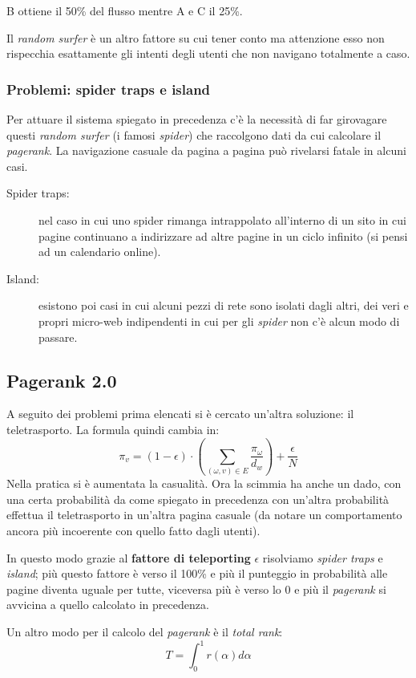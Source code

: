 					B ottiene il 50\% del flusso mentre A e C il 25\%.
					
				Il \emph{random surfer} è un altro fattore su cui tener conto ma attenzione esso non rispecchia esattamente gli intenti degli utenti che non navigano totalmente a caso.
			
			\subsubsection{Problemi: spider traps e island}
				Per attuare il sistema spiegato in precedenza c'è la necessità di far girovagare questi \emph{random surfer} (i famosi \emph{spider}) che raccolgono dati da cui calcolare il \emph{pagerank}. La navigazione casuale da pagina a pagina può rivelarsi fatale in alcuni casi.
				\begin{description}
					\item[Spider traps:] nel caso in cui uno spider rimanga intrappolato all'interno di un sito in cui pagine continuano a indirizzare ad altre pagine in un ciclo infinito (si pensi ad un calendario online).
					\item[Island:] esistono poi casi in cui alcuni pezzi di rete sono isolati dagli altri, dei veri e propri micro-web indipendenti in cui per gli \emph{spider} non c'è alcun modo di passare. 
				\end{description}
				
		\subsection{Pagerank 2.0}
			A seguito dei problemi prima elencati si è cercato un'altra soluzione: il teletrasporto. La formula quindi cambia in:
			\[
				\pi_v=(1-\epsilon)\cdot(\sum_{(\omega, v) \in E}\frac{\pi_{\omega}}{d_w})+\frac{\epsilon}{N}
			\]
			Nella pratica si è aumentata la casualità. Ora la scimmia ha anche un dado, con una certa probabilità da come spiegato in precedenza con un'altra probabilità effettua il teletrasporto in un'altra pagina casuale (da notare un comportamento ancora più incoerente con quello fatto dagli utenti).
			
			In questo modo grazie al \textbf{fattore di teleporting} $\epsilon$ risolviamo \emph{spider traps} e \emph{island}; più questo fattore è verso il 100\% e più il punteggio in probabilità alle pagine diventa uguale per tutte, viceversa più è verso lo 0 e più il \emph{pagerank} si avvicina a quello calcolato in precedenza.
			
			Un altro modo per il calcolo del \emph{pagerank} è il \emph{total rank}:
			\[
				T=\int_0^1r(\alpha) d\alpha
			\]
			
